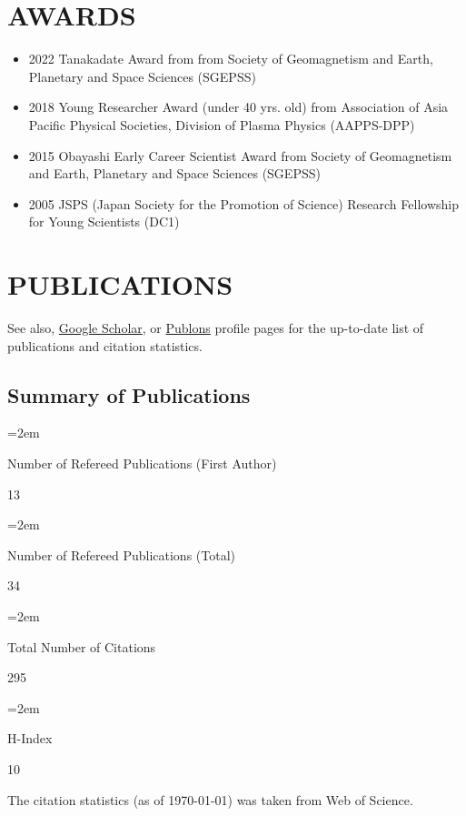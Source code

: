 \documentclass[lualatex,a4paper,ja=standard]{scrartcl}
\newcommand{\NewPart}[2]{\section*{\uppercase{#1} #2}}
\newcommand{\NewSubPart}[1]{\subsection*{#1}}
\newcommand{\GeneralEntry}[4]{
\noindent\hangindent=2em\hangafter=0
\parbox{#1}{#3}
\hspace{1em}
\parbox{#2}{#4} \par
\vspace{0.5em}
}
\begin{document}
\NewPart{Awards}{}
\begin{itemize}
\item 2022 Tanakadate Award from from Society of Geomagnetism and Earth, Planetary and Space Sciences (SGEPSS)
\item 2018 Young Researcher Award (under 40 yrs. old) from Association of Asia Pacific Physical Societies, Division of Plasma Physics (AAPPS-DPP)
\item 2015 Obayashi Early Career Scientist Award from Society of Geomagnetism and Earth, Planetary and Space Sciences (SGEPSS)
\item 2005 JSPS (Japan Society for the Promotion of Science) Research Fellowship for Young Scientists (DC1)
\end{itemize}


\clearpage
\NewPart{Publications}{}

See also,
\href{https://scholar.google.co.jp/citations?hl=ja&user=o23rFB8AAAAJ&view_op=list_works&sortby=pubdate}{Google Scholar}, or
\href{https://publons.com/researcher/2523588/takanobu-amano/}{Publons} profile pages
for the up-to-date list of publications and citation statistics.

\ifWOS
\NewSubPart{Summary of Publications}

\GeneralEntry{28em}{8em}{Number of Refereed Publications (First Author)}{13}
\GeneralEntry{28em}{8em}{Number of Refereed Publications (Total)}{34}
\GeneralEntry{28em}{8em}{Total Number of Citations}{295}
\GeneralEntry{28em}{8em}{H-Index}{10}

The citation statistics (as of \today) was taken from Web of Science.
\fi

%

\end{document}
